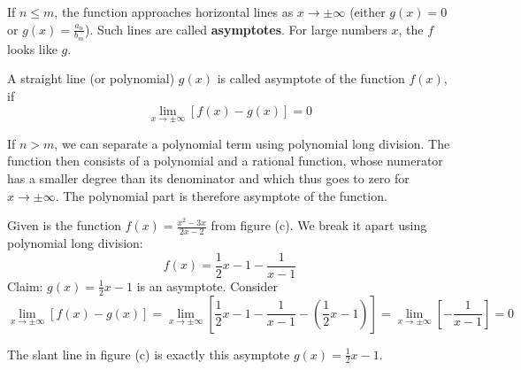 \documentclass[12pt,eng]{skript_ogg}
\begin{document}
\vspace{-2mm}

If $n\leqslant m$, the function approaches horizontal lines as  $x\rightarrow\pm\infty$ (either $g(x)=0$ or $g(x)=\frac{a_n}{b_m}$). Such lines are called \textbf{asymptotes}. For large numbers $x$, the $f$ looks like $g$.

\begin{defn}
A straight line (or polynomial) $g(x)$ is called asymptote of the function $f(x)$, if
\[\lim_{x\to\pm\infty}\left[f(x)-g(x)\right]=0\]
\end{defn}

If $n>m$, we can separate a polynomial term using polynomial long division. The function then consists of a polynomial and a rational function, whose numerator has a smaller degree than its denominator and which thus goes to zero for $x\rightarrow\pm\infty$. The polynomial part is therefore asymptote of the function.

\begin{beispiel}
Given is the function $f(x)=\frac{x^2-3x}{2x-2}$ from figure (c). We break it apart using polynomial long division:
\[f(x)=\frac{1}{2}x-1-\frac{1}{x-1}\]
Claim: $g(x)=\frac{1}{2}x-1$ is an asymptote. Consider
\[\lim_{x\to\pm\infty}\left[f(x)-g(x)\right]=\lim_{x\to\pm\infty}\left[\frac{1}{2}x-1-\frac{1}{x-1}-\left(\frac{1}{2}x-1\right)\right]=\lim_{x\to\pm\infty}\left[-\frac{1}{x-1}\right]=0\]
\end{beispiel}

The slant line in figure (c) is exactly this asymptote $g(x)=\frac{1}{2}x-1$.

\newpage
\end{document}
